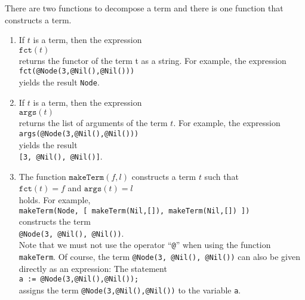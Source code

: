 There are two functions to decompose a term and there is one function that constructs a term.
\begin{enumerate}
\item If $t$ is a term, then the expression
      \\[0.2cm]
      \hspace*{1.3cm}
      $\texttt{fct}(t)$
      \\[0.2cm]
      returns the functor of the term t as a string.  For example, the expression
      \\[0.2cm]
      \hspace*{1.3cm}
      \texttt{fct(@Node(3,@Nil(),@Nil()))}
      \\[0.2cm]
      yields the result \texttt{Node}.
\item If $t$ is a term, then the expression
      \\[0.2cm]
      \hspace*{1.3cm}
      $\mathtt{args}(t)$
      \\[0.2cm]
      returns the list of arguments of the term $t$.  For example, the expression
      \\[0.2cm]
      \hspace*{1.3cm}
      \texttt{args(@Node(3,@Nil(),@Nil()))}
      \\[0.2cm]
      yields the result 
      \\[0.2cm]
      \hspace*{1.3cm}
      \texttt{[3, @Nil(), @Nil()]}.
\item The function $\texttt{makeTerm}(f,l)$ constructs a term $t$ such that
      \\[0.2cm]
      \hspace*{1.3cm}
      $\mathtt{fct}(t) = f$  \quad and \quad $\mathtt{args}(t) = l$
      \\[0.2cm]
      holds.  For example,
      \\[0.2cm]
      \hspace*{1.3cm}
      \texttt{makeTerm(Node, 
             [ makeTerm(Nil,[]), makeTerm(Nil,[]) ])}
      \\[0.2cm]
      constructs the term
      \\[0.2cm]
      \hspace*{1.3cm}
      \texttt{@Node(3, @Nil(), @Nil())}.
      \\[0.2cm]
      Note that we must not use the operator ``\texttt{@}'' when using the function \texttt{makeTerm}.
      Of course,  the term \texttt{@Node(3, @Nil(), @Nil())} can also be given directly as an
      expression: The statement 
      \\[0.2cm]
      \hspace*{1.3cm}
      \texttt{a := @Node(3,@Nil(),@Nil());}
      \\[0.2cm]
      assigns the term \texttt{@Node(3,@Nil(),@Nil())} to the variable \texttt{a}.
\end{enumerate}

